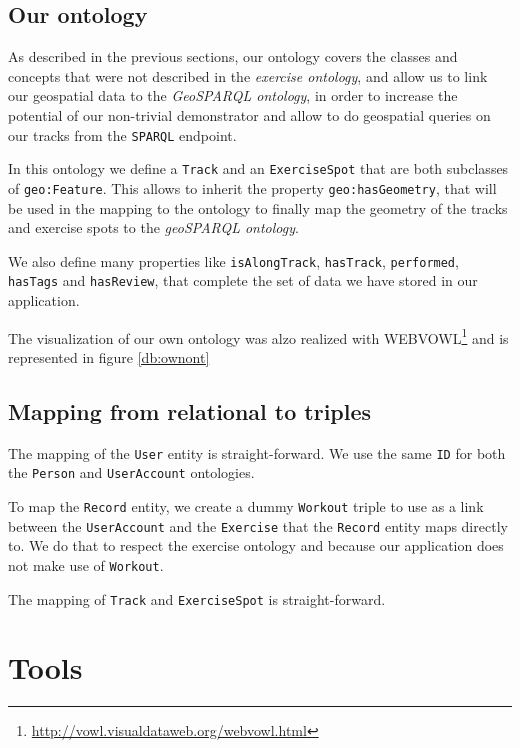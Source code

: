 \documentclass[11pt,a4paper]{scrreprt}
\begin{document}
\section{Our ontology}
As described in the previous sections, our ontology covers the classes and concepts that were not described in the \textit{exercise ontology}, and allow us to link our geospatial data to the \textit{GeoSPARQL ontology}, in order to increase the potential of our non-trivial demonstrator and allow to do geospatial queries on our tracks from the \texttt{SPARQL} endpoint.

In this ontology we define a \texttt{Track} and an \texttt{ExerciseSpot} that are both subclasses of \texttt{geo:Feature}. This allows to inherit the property \texttt{geo:hasGeometry}, that will be used in the mapping to the ontology to finally map the geometry of the tracks and exercise spots to the \textit{geoSPARQL ontology}.

We also define many properties like \texttt{isAlongTrack}, \texttt{hasTrack}, \texttt{performed}, \texttt{hasTags} and \texttt{hasReview}, that complete the set of data we have stored in our application.

The visualization of our own ontology was alzo realized with WEBVOWL\footnote{\url{http://vowl.visualdataweb.org/webvowl.html}} and is represented in figure \ref{db:ownont}

\section{Mapping from relational to triples}

The mapping of the \texttt{User} entity is straight-forward. We use the same \texttt{ID} for both the \texttt{Person} and \texttt{UserAccount} ontologies.

To map the \texttt{Record} entity, we create a dummy \texttt{Workout} triple to use as a link between the \texttt{UserAccount} and the \texttt{Exercise} that the \texttt{Record} entity maps directly to. We do that to respect the exercise ontology and because our application does not make use of \texttt{Workout}.

The mapping of \texttt{Track} and \texttt{ExerciseSpot} is straight-forward.

\chapter{Tools}
\end{document}
